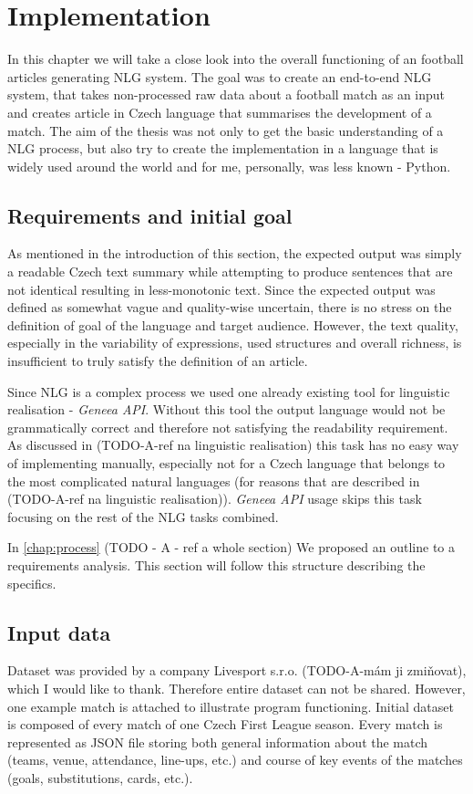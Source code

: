 \chapter{Implementation}

In this chapter we will take a close look into the overall functioning of an football articles generating NLG system. The goal was to create an end-to-end NLG system, that takes non-processed raw data about a football match as an input and creates article in Czech language that summarises the development of a match. The aim of the thesis was not only to get the basic understanding of a NLG process, but also try to create the implementation in a language that is widely used around the world and for me, personally, was less known - Python.

\section{Requirements and initial goal}
As mentioned in the introduction of this section, the expected output was simply a readable Czech text summary while attempting to produce sentences that are not identical resulting in less-monotonic text. Since the expected output was defined as somewhat vague and quality-wise uncertain, there is no stress on the definition of goal of the language and target audience. However, the text quality, especially in the variability of expressions, used structures and overall richness, is insufficient to truly satisfy the definition of an article. 

Since NLG is a complex process we used one already existing tool for linguistic realisation - \emph{Geneea API}. Without this tool the output language would not be grammatically correct and therefore not satisfying the readability requirement. As discussed in (TODO-A-ref na linguistic realisation) this task has no easy way of implementing manually, especially not for a Czech language that belongs to the most complicated natural languages (for reasons that are described in (TODO-A-ref na linguistic realisation)). \emph{Geneea API} usage skips this task focusing on the rest of the NLG tasks combined.

In \autoref{chap:process} (TODO - A - ref a whole section) We proposed an outline to a requirements analysis. This section will follow this structure describing the specifics.

\section{Input data}
Dataset was provided by a company Livesport s.r.o. (TODO-A-mám ji zmiňovat), which I would like to thank. Therefore entire dataset can not be shared. However, one example match is attached to illustrate program functioning. Initial dataset is composed of every match of one Czech First League season. Every match is represented as JSON file storing both general information about the match (teams, venue, attendance, line-ups, etc.) and course of key events of the matches (goals, substitutions, cards, etc.). 

